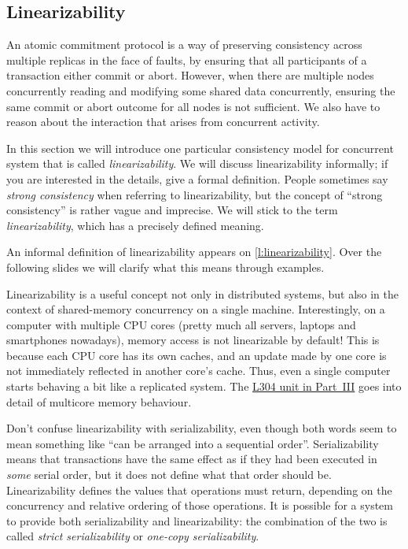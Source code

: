 \subsection{Linearizability}\label{sec:linearizability}

An atomic commitment protocol is a way of preserving consistency across multiple replicas in the face of faults, by ensuring that all participants of a transaction either commit or abort.
However, when there are multiple nodes concurrently reading and modifying some shared data concurrently, ensuring the same commit or abort outcome for all nodes is not sufficient.
We also have to reason about the interaction that arises from concurrent activity.

In this section we will introduce one particular consistency model for concurrent system that is called \emph{linearizability}.
We will discuss linearizability informally; if you are interested in the details, \cite{Herlihy:1990} give a formal definition.
People sometimes say \emph{strong consistency} when referring to linearizability, but the concept of ``strong consistency'' is rather vague and imprecise.
We will stick to the term \emph{linearizability}, which has a precisely defined meaning.

An informal definition of linearizability appears on \autoref{l:linearizability}.
Over the following slides we will clarify what this means through examples.

Linearizability is a useful concept not only in distributed systems, but also in the context of shared-memory concurrency on a single machine.
Interestingly, on a computer with multiple CPU cores (pretty much all servers, laptops and smartphones nowadays), memory access is not linearizable by default!
This is because each CPU core has its own caches, and an update made by one core is not immediately reflected in another core's cache.
Thus, even a single computer starts behaving a bit like a replicated system.
The \href{\multicore}{L304 unit in Part~III} goes into detail of multicore memory behaviour.

Don't confuse linearizability with serializability, even though both words seem to mean something like ``can be arranged into a sequential order''.
Serializability means that transactions have the same effect as if they had been executed in \emph{some} serial order, but it does not define what that order should be.
Linearizability defines the values that operations must return, depending on the concurrency and relative ordering of those operations.
It is possible for a system to provide both serializability and linearizability: the combination of the two is called \emph{strict serializability} or \emph{one-copy serializability}.

